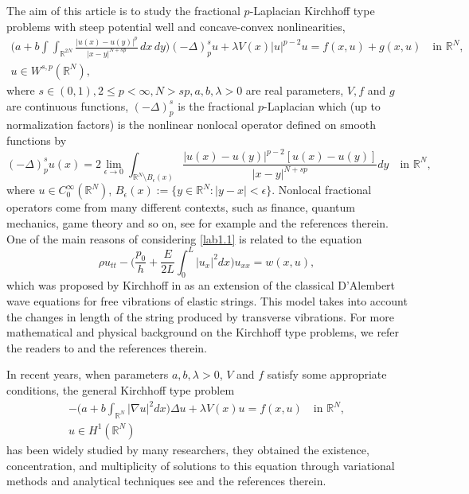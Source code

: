 \documentclass[10pt,a4paper]{amsart}
\numberwithin{equation}{section}
\begin{document}
The aim of this article is to study the fractional $p$-Laplacian Kirchhoff type 
problems with steep potential well and concave-convex nonlinearities,
\begin{equation}\label{lab1.1}
\begin{gathered}
\Big(a+b\int\int_{\mathbb{R}^{2N}}\frac{|u(x)-u(y)|^p}{|x-y|^{N+sp}}\,dx\,dy\Big)
(-\Delta)_p^su+\lambda V(x)|u|^{p-2}u=f(x,u)+g(x,u)\quad \text{in }\mathbb{R}^N, \\
u\in W^{s,p}(\mathbb{R}^N),
\end{gathered}
\end{equation}
where $s\in(0,1), 2\leq p<\infty, N>sp, a, b, \lambda>0$ are real parameters, $V, f$ 
and $g$ are continuous functions, $(-\Delta)^s_p$ is the fractional $p$-Laplacian 
which (up to normalization factors) is the nonlinear nonlocal operator defined on 
smooth functions by
$$
(-\Delta)^s_pu(x)=2\lim_{\epsilon\to 0}\int_{\mathbb{R}^N\setminus 
B_\epsilon(x)}\frac{|u(x)-u(y)|^{p-2}[u(x)-u(y)]}{|x-y|^{N+sp}}dy\quad
 \text{in }\mathbb{R}^N,
$$
where $u\in C_0^\infty(\mathbb{R}^N)$, 
$B_\epsilon(x):=\{y\in\mathbb{R}^N:|y-x|<\epsilon\}$. Nonlocal fractional operators 
come from many different contexts, such as finance, quantum mechanics, 
game theory and so on, see for example \cite{r5, r14, r15,r18} and the references 
therein. One of the main reasons of considering \eqref{lab1.1} is related to the 
equation
$$
 \rho u_{tt}-\Big(\frac{p_0}{h}+\frac{E}{2L}\int^L_0 |u_x|^2dx \Big)u_{xx}=w(x,u),
$$
which was proposed by Kirchhoff in \cite{r13} as an extension of the classical 
D'Alembert wave equations for free vibrations of elastic strings. 
This model takes into account the changes in length of the string produced by 
transverse vibrations. For more mathematical and physical background on the 
Kirchhoff type problems, we refer the readers to \cite{r1, r4} and the references 
therein.

In recent years, when parameters $a, b, \lambda>0$, $V$ and $f$ satisfy some 
appropriate conditions, the general Kirchhoff type problem
\begin{gather*}
-\Big(a+b\int_{\mathbb{R}^N}|\nabla u|^2dx\Big)\Delta u+\lambda V(x)u= f(x,u)\quad
 \text{in } \mathbb{R}^N, \\
u\in H^1(\mathbb{R}^N)
\end{gather*}
has been widely studied by many researchers, they obtained the existence, 
concentration, and multiplicity of solutions to this equation through variational 
methods and analytical techniques see \cite{r10, r16, r23, r27, r30, r34} and the 
references therein.
\end{document}
